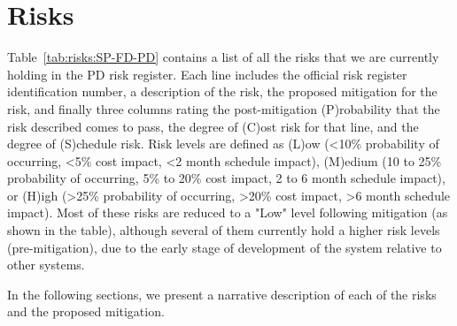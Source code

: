\section{Risks}
\label{sec:fdsp-pd-risks}

Table~\ref{tab:risks:SP-FD-PD} contains a list of all the
risks that we are currently holding in the PD risk register.  Each line includes the official  risk register identification number, a description of the risk, the proposed mitigation for the risk, and finally three columns rating the post-mitigation (P)robability that the risk described comes to pass, the degree of (C)ost risk for that line, and the degree of (S)chedule risk.  Risk levels are defined as (L)ow (<10\% probability of occurring, <5\% cost impact, <2 month schedule impact), (M)edium (10 to 25\% probability of occurring, 5\% to 20\% cost impact, 2 to 6 month schedule impact), or (H)igh (>25\% probability of occurring, >20\% cost impact, >6 month schedule impact).  Most of these risks are reduced to a "Low" level following mitigation (as shown in the table), although several of them currently hold a higher risk levels (pre-mitigation), due to the early stage of development of the  system relative to other systems.  

In the following sections, we present a narrative description of each of the risks and the proposed mitigation.



